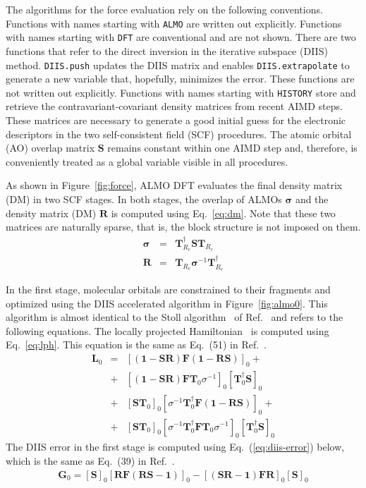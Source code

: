 \documentclass[aip,jcp,reprint,amsmath,amssymb]{revtex4-1}
\begin{document}
The algorithms for the force evaluation rely on the following conventions. Functions with names starting with \texttt{ALMO} are written out explicitly. Functions with names starting with \texttt{DFT} are conventional and are not shown. There are two functions that refer to the direct inversion in the iterative subspace (DIIS) method. \texttt{DIIS.push} updates the DIIS matrix and enables \texttt{DIIS.extrapolate} to generate a new variable that, hopefully, minimizes the error. These functions are not written out explicitly. Functions with names starting with \texttt{HISTORY} store and retrieve the contravariant-covariant density matrices from recent AIMD steps. These matrices are necessary to generate a good initial guess for the electronic descriptors in the two self-consistent field (SCF) procedures. The atomic orbital (AO) overlap matrix $\mathbf{S}$ remains constant within one AIMD step and, therefore, is conveniently treated as a global variable visible in all procedures.

As shown in Figure~\ref{fig:force}, ALMO DFT evaluates the final density matrix (DM) in two SCF stages. In both stages, the overlap of ALMOs $\mathbf{\sigma}$ and the density matrix (DM) $\mathbf{R}$ is computed using Eq.~\ref{eq:dm}. Note that these two matrices are naturally sparse, that is, the block structure is not imposed on them.
%
\begin{eqnarray}\label{eq:dm}
\mathbf{\sigma} &=& \mathbf{T}_{R_c}^{\dagger}\mathbf{S} \mathbf{T}_{R_c} \nonumber \\
\mathbf{R} &=& \mathbf{T}_{R_c} \mathbf{\sigma}^{-1} \mathbf{T}_{R_c}^{\dagger}
\end{eqnarray}
%

In the first stage, molecular orbitals are constrained to their fragments and optimized using the DIIS accelerated algorithm in Figure~\ref{fig:almo0}. This algorithm is almost identical to the Stoll algorithm~\cite{a:stoll} of Ref.~\cite{a:khal} and refers to the following equations. The locally projected Hamiltonian~\cite{a:stoll} is computed using Eq.~\ref{eq:lph}. This equation is the same as Eq.~(51) in Ref.~.
%
\begin{eqnarray}\label{eq:lph}
\mathbf{L}_0 &=& [ (\mathbf{1} - \mathbf{SR}) \mathbf{F} (\mathbf{1} - \mathbf{RS}) ]_{0} + \nonumber\\
&+& [ (\mathbf{1} - \mathbf{SR}) \mathbf{FT}_0 \sigma^{-1}]_0 [ \mathbf{T}_0^{\dagger}\mathbf{S} ]_{0} \nonumber\\
&+& [ \mathbf{ST}_0 ]_{0} [ \sigma^{-1}\mathbf{T}_0^{\dagger}\mathbf{F}(\mathbf{1} - \mathbf{RS}) ]_0 + \nonumber\\
&+& [ \mathbf{ST}_0]_0 [ \sigma^{-1}\mathbf{T}_0^{\dagger}\mathbf{FT}_0 \sigma^{-1}]_{0} [ \mathbf{T}_0^{\dagger}\mathbf{S} ]_{0}
\end{eqnarray}
%
The DIIS error in the first stage is computed using Eq.~(\ref{eq:diis-error}) below, which is the same as Eq.~(39) in Ref.~.
%
\begin{eqnarray}\label{eq:diis-error}
\mathbf{G}_0 = [\mathbf{S}]_0 [\mathbf{RF}(\mathbf{RS-1})]_0 - [(\mathbf{SR-1})\mathbf{FR}]_0 [\mathbf{S}]_0
\end{eqnarray}
\end{document}
